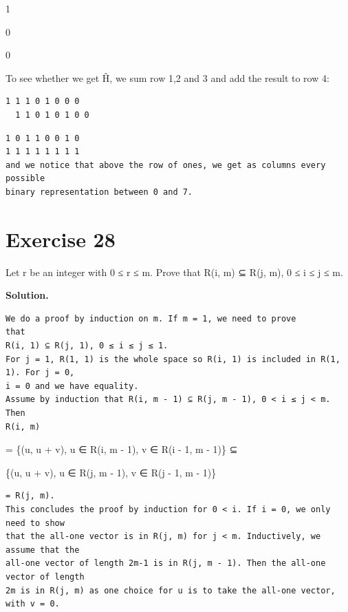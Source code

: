 \documentclass[11pt]{article}
\begin{document}
\begin{solutionbox}
1

0

0

To see whether we get Ĥ, we sum row 1,2 and 3 and add the result to row 4:

\begin{Verbatim}[fontsize=\small]
1 1 1 0 1 0 0 0
  1 1 0 1 0 1 0 0
\end{Verbatim}
\begin{Verbatim}[fontsize=\small]
1 0 1 1 0 0 1 0
1 1 1 1 1 1 1 1
and we notice that above the row of ones, we get as columns every possible
binary representation between 0 and 7.
\end{Verbatim}
\end{solutionbox}
\section*{Exercise 28}
\begin{exercisebox}
Let r be an integer with 0 ≤ r ≤ m. Prove that R(i, m) ⊆ R(j, m), 0 ≤ i ≤ j ≤ m.

\end{exercisebox}
\begin{solutionbox}
\textbf{Solution.}

\begin{Verbatim}[fontsize=\small]
We do a proof by induction on m. If m = 1, we need to prove
that
R(i, 1) ⊆ R(j, 1), 0 ≤ i ≤ j ≤ 1.
For j = 1, R(1, 1) is the whole space so R(i, 1) is included in R(1, 1). For j = 0,
i = 0 and we have equality.
Assume by induction that R(i, m - 1) ⊆ R(j, m - 1), 0 < i ≤ j < m. Then
R(i, m)
\end{Verbatim}
= \{(u, u + v), u ∈ R(i, m - 1), v ∈ R(i - 1, m - 1)\} ⊆

\{(u, u + v), u ∈ R(j, m - 1), v ∈ R(j - 1, m - 1)\}

\begin{Verbatim}[fontsize=\small]
= R(j, m).
This concludes the proof by induction for 0 < i. If i = 0, we only need to show
that the all-one vector is in R(j, m) for j < m. Inductively, we assume that the
all-one vector of length 2m-1 is in R(j, m - 1). Then the all-one vector of length
2m is in R(j, m) as one choice for u is to take the all-one vector, with v = 0.
\end{Verbatim}
\end{solutionbox}
\end{document}
